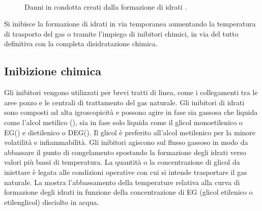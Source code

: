 \begin{figure}[htbp]
    \centering
     \qquad
     \\
\caption{Danni in condotta creati dalla formazione di idrati \parencite{borghi2005idrati}.}
\label{fig:idrati}
\end{figure}

Si inibisce la formazione di idrati in via temporanea aumentando la temperatura di trasporto del gas o tramite l'impiego di inibitori chimici, in via del tutto definitiva con la completa disidratazione chimica.

\subsection{Inibizione chimica}
Gli inibitori vengono utilizzati per brevi tratti di linea, come i collegamenti tra le aree pozzo e le centrali di trattamento del gas naturale. Gli inibitori di idrati sono composti ad alta igroscopicità e possono agire in fase sia gassosa che liquida come l'alcol metilico (), sia in fase solo liquida come il glicol monoetilenico o EG() e dietilenico o DEG(). Il glicol è preferito all'alcol metilenico per la minore volatilità e infiammabilità.
Gli inibitori agiscono sul flusso gassoso in modo da abbassare il punto di congelamento spostando la formazione degli idrati verso valori più bassi di temperatura. La quantità o la concentrazione di glicol da iniettare è legata alle condizioni operative con cui si intende trasportare il gas naturale. La  mostra l'abbassamento della temperature relativa alla curva di formazione degli idrati in funzione della concentrazione di EG (glicol etilenico o etilenglicol) disciolto in acqua.

